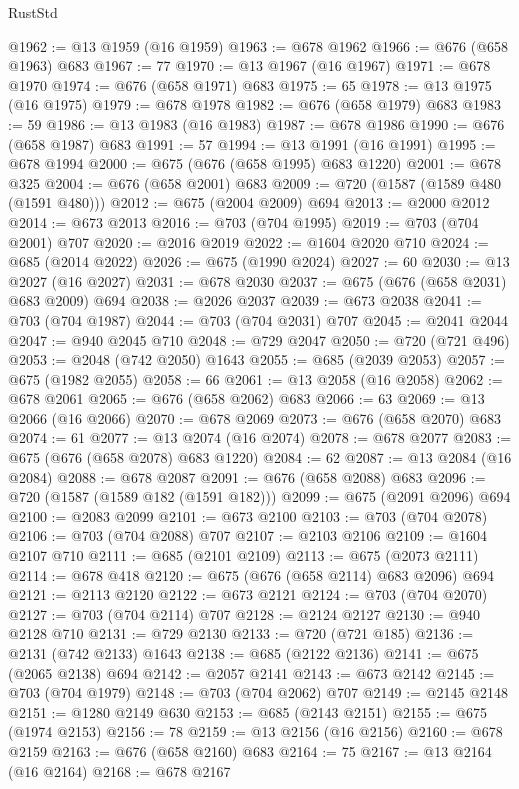 \begin{lexlean}{RustStd}
\begin{coremodule}
@1962 := @13 @1959 (@16 @1959)
@1963 := @678 @1962
@1966 := @676 (@658 @1963) @683
@1967 := 77
@1970 := @13 @1967 (@16 @1967)
@1971 := @678 @1970
@1974 := @676 (@658 @1971) @683
@1975 := 65
@1978 := @13 @1975 (@16 @1975)
@1979 := @678 @1978
@1982 := @676 (@658 @1979) @683
@1983 := 59
@1986 := @13 @1983 (@16 @1983)
@1987 := @678 @1986
@1990 := @676 (@658 @1987) @683
@1991 := 57
@1994 := @13 @1991 (@16 @1991)
@1995 := @678 @1994
@2000 := @675 (@676 (@658 @1995) @683 @1220)
@2001 := @678 @325
@2004 := @676 (@658 @2001) @683
@2009 := @720 (@1587 (@1589 @480 (@1591 @480)))
@2012 := @675 (@2004 @2009) @694
@2013 := @2000 @2012
@2014 := @673 @2013
@2016 := @703 (@704 @1995)
@2019 := @703 (@704 @2001) @707
@2020 := @2016 @2019
@2022 := @1604 @2020 @710
@2024 := @685 (@2014 @2022)
@2026 := @675 (@1990 @2024)
@2027 := 60
@2030 := @13 @2027 (@16 @2027)
@2031 := @678 @2030
@2037 := @675 (@676 (@658 @2031) @683 @2009) @694
@2038 := @2026 @2037
@2039 := @673 @2038
@2041 := @703 (@704 @1987)
@2044 := @703 (@704 @2031) @707
@2045 := @2041 @2044
@2047 := @940 @2045 @710
@2048 := @729 @2047
@2050 := @720 (@721 @496)
@2053 := @2048 (@742 @2050) @1643
@2055 := @685 (@2039 @2053)
@2057 := @675 (@1982 @2055)
@2058 := 66
@2061 := @13 @2058 (@16 @2058)
@2062 := @678 @2061
@2065 := @676 (@658 @2062) @683
@2066 := 63
@2069 := @13 @2066 (@16 @2066)
@2070 := @678 @2069
@2073 := @676 (@658 @2070) @683
@2074 := 61
@2077 := @13 @2074 (@16 @2074)
@2078 := @678 @2077
@2083 := @675 (@676 (@658 @2078) @683 @1220)
@2084 := 62
@2087 := @13 @2084 (@16 @2084)
@2088 := @678 @2087
@2091 := @676 (@658 @2088) @683
@2096 := @720 (@1587 (@1589 @182 (@1591 @182)))
@2099 := @675 (@2091 @2096) @694
@2100 := @2083 @2099
@2101 := @673 @2100
@2103 := @703 (@704 @2078)
@2106 := @703 (@704 @2088) @707
@2107 := @2103 @2106
@2109 := @1604 @2107 @710
@2111 := @685 (@2101 @2109)
@2113 := @675 (@2073 @2111)
@2114 := @678 @418
@2120 := @675 (@676 (@658 @2114) @683 @2096) @694
@2121 := @2113 @2120
@2122 := @673 @2121
@2124 := @703 (@704 @2070)
@2127 := @703 (@704 @2114) @707
@2128 := @2124 @2127
@2130 := @940 @2128 @710
@2131 := @729 @2130
@2133 := @720 (@721 @185)
@2136 := @2131 (@742 @2133) @1643
@2138 := @685 (@2122 @2136)
@2141 := @675 (@2065 @2138) @694
@2142 := @2057 @2141
@2143 := @673 @2142
@2145 := @703 (@704 @1979)
@2148 := @703 (@704 @2062) @707
@2149 := @2145 @2148
@2151 := @1280 @2149 @630
@2153 := @685 (@2143 @2151)
@2155 := @675 (@1974 @2153)
@2156 := 78
@2159 := @13 @2156 (@16 @2156)
@2160 := @678 @2159
@2163 := @676 (@658 @2160) @683
@2164 := 75
@2167 := @13 @2164 (@16 @2164)
@2168 := @678 @2167

\end{coremodule}
\end{lexlean}
